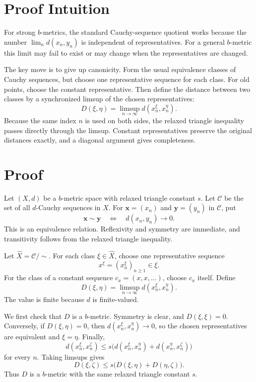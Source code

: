 \documentclass[11pt]{article}
\newcommand{\calC}{\mathcal C}
\begin{document}
\section*{Proof Intuition}

For strong \(b\)-metrics, the standard Cauchy-sequence quotient works because
the number \(\lim_n d(x_n,y_n)\) is independent of representatives.  For a
general \(b\)-metric this limit may fail to exist or may change when the
representatives are changed.

The key move is to give up canonicity.  Form the usual equivalence classes of
Cauchy sequences, but choose one representative sequence for each class.  For
old points, choose the constant representative.  Then define the distance
between two classes by a synchronized limsup of the chosen representatives:
\[
        D(\xi,\eta)=\limsup_{n\to\infty} d(x^\xi_n,x^\eta_n).
\]
Because the same index \(n\) is used on both sides, the relaxed triangle
inequality passes directly through the limsup.  Constant representatives
preserve the original distances exactly, and a diagonal argument gives
completeness.

\section*{Proof}

Let \((X,d)\) be a \(b\)-metric space with relaxed triangle constant \(s\).
Let \(\calC\) be the set of all \(d\)-Cauchy sequences in \(X\).  For
\(\mathbf x=(x_n)\) and \(\mathbf y=(y_n)\) in \(\calC\), put
\[
        \mathbf x\sim\mathbf y
        \quad\Longleftrightarrow\quad
        d(x_n,y_n)\to0 .
\]
This is an equivalence relation.  Reflexivity and symmetry are immediate, and
transitivity follows from the relaxed triangle inequality.

Let \(\widehat X=\calC/\!\sim\).  For each class \(\xi\in\widehat X\), choose
one representative sequence
\[
        x^\xi=(x^\xi_n)_{n\ge1}\in\xi .
\]
For the class of a constant sequence \(c_x=(x,x,\dots)\), choose \(c_x\)
itself.  Define
\[
        D(\xi,\eta)=\limsup_{n\to\infty} d(x^\xi_n,x^\eta_n).
\]
The value is finite because \(d\) is finite-valued.

We first check that \(D\) is a \(b\)-metric.  Symmetry is clear, and
\(D(\xi,\xi)=0\).  Conversely, if \(D(\xi,\eta)=0\), then
\(d(x^\xi_n,x^\eta_n)\to0\), so the chosen representatives are equivalent and
\(\xi=\eta\).  Finally,
\[
 d(x^\xi_n,x^\zeta_n)
 \le s\bigl(d(x^\xi_n,x^\eta_n)+d(x^\eta_n,x^\zeta_n)\bigr)
\]
for every \(n\).  Taking limsups gives
\[
        D(\xi,\zeta)\le s\bigl(D(\xi,\eta)+D(\eta,\zeta)\bigr).
\]
Thus \(D\) is a \(b\)-metric with the same relaxed triangle constant \(s\).
\end{document}
